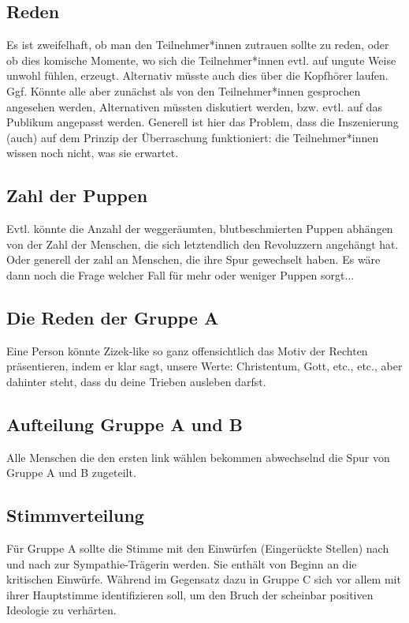 \documentclass[a4paper, 12pt]{report}
\begin{document}
\subsection*{Reden}
Es ist zweifelhaft, ob man den Teilnehmer*innen zutrauen sollte zu reden, oder ob dies komische Momente, wo sich die Teilnehmer*innen evtl. auf ungute Weise unwohl fühlen, erzeugt.
Alternativ müsste auch dies über die Kopfhörer laufen. 
Ggf. Könnte alle aber zunächst als von den Teilnehmer*innen gesprochen angesehen werden, Alternativen müssten diskutiert werden, bzw. evtl. auf das Publikum angepasst werden. 
Generell ist hier das Problem, dass die Inszenierung (auch) auf dem Prinzip der Überraschung funktioniert: 
die Teilnehmer*innen wissen noch nicht, was sie erwartet.

\subsection*{Zahl der Puppen}\label{zahl_der_puppen}
Evtl. könnte die Anzahl der weggeräumten, blutbeschmierten Puppen abhängen von der Zahl der Menschen, die sich letztendlich den Revoluzzern angehängt hat. 
Oder generell der zahl an Menschen, die ihre Spur gewechselt haben.
Es wäre dann noch die Frage welcher Fall für mehr oder weniger Puppen sorgt...

\subsection*{Die Reden der Gruppe A}
Eine Person könnte Zizek-like so ganz offensichtlich das Motiv der Rechten präsentieren, indem er klar sagt, unsere Werte: 
Christentum, Gott, etc., etc., aber dahinter steht, dass du deine Trieben ausleben darfst.

\subsection*{Aufteilung Gruppe A und B}
Alle Menschen die den ersten link wählen bekommen abwechselnd die Spur von Gruppe A und B zugeteilt.

\subsection*{Stimmverteilung}
Für Gruppe A sollte die Stimme mit den Einwürfen (Eingerückte Stellen) nach und nach zur Sympathie-Trägerin werden.
Sie enthält von Beginn an die kritischen Einwürfe. 
Während im Gegensatz dazu in Gruppe C sich vor allem mit ihrer Hauptstimme identifizieren soll, um den Bruch der scheinbar positiven Ideologie zu verhärten.
\end{document}
